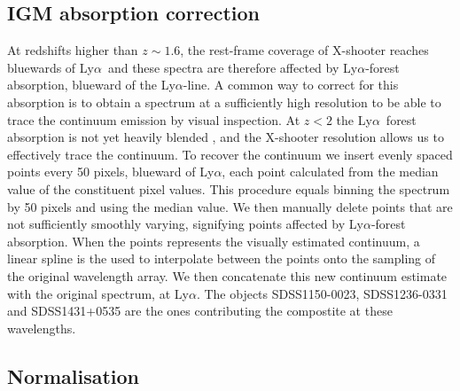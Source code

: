 \documentclass{aa}    %
\newcommand{\sectlabel}[1]{\label{sect:#1}}
\newcommand{\lya}{Ly$\alpha$}
\begin{document}
\subsection{IGM absorption correction} \sectlabel{igm}

At redshifts higher than $z\sim1.6$, the rest-frame coverage of X-shooter reaches bluewards of \lya~and these spectra are therefore affected by \lya-forest absorption, blueward of the \lya-line. A common way to correct for this absorption is to obtain a spectrum at a sufficiently high resolution to be able to trace the continuum emission by visual inspection. At $z < 2 $ the \lya~forest absorption is not yet heavily blended \citep{DallAglio2008}, and the X-shooter resolution allows us to effectively trace the continuum. To recover the continuum we insert evenly spaced points every 50 pixels, blueward of \lya, each point calculated from the median value of the constituent pixel values. This procedure equals binning the spectrum by 50 pixels and using the median value. We then manually delete points that are not sufficiently smoothly varying, signifying points affected by \lya-forest absorption. When the points represents the visually estimated continuum, a linear spline is the used to interpolate between the points onto the sampling of the original wavelength array. We then concatenate this new continuum estimate with the original spectrum, at \lya. The objects SDSS1150-0023, SDSS1236-0331 and SDSS1431+0535 are the ones contributing the compostite at these wavelengths. 


\subsection{Normalisation}  \sectlabel{norm}
\end{document}
